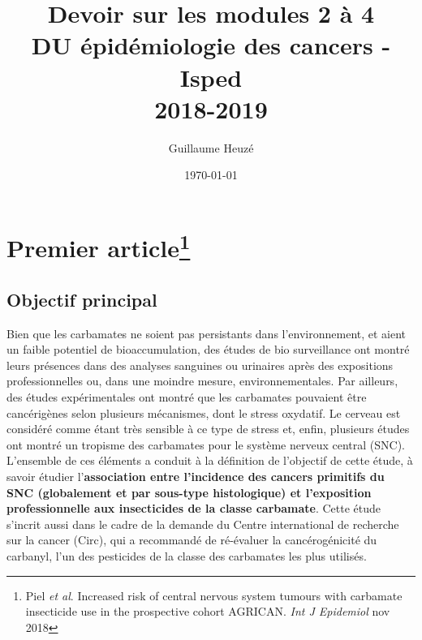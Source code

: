 \documentclass[10pt]{article}
\begin{document}
\title{Devoir sur les modules 2 à 4\\
\small{DU épidémiologie des cancers - Isped\\
2018-2019}}
\author{Guillaume Heuzé}
\date{\today}
\maketitle

\section{Premier article\protect\footnote{Piel \emph{et al}. Increased risk of central nervous system tumours with carbamate insecticide use in the prospective cohort AGRICAN. \emph{Int J Epidemiol} nov 2018}}

\subsection{Objectif principal}
Bien que les carbamates ne soient pas persistants dans l'environnement, et aient un faible potentiel de bioaccumulation, des études de bio surveillance ont montré leurs présences dans des analyses sanguines ou urinaires après des expositions professionnelles ou, dans une moindre mesure, environnementales. Par ailleurs, des études expérimentales ont montré que les carbamates pouvaient être cancérigènes selon plusieurs mécanismes, dont le stress oxydatif. Le cerveau est considéré comme étant très sensible à ce type de stress et, enfin, plusieurs études ont montré un tropisme des carbamates pour le système nerveux central (SNC). L'ensemble de ces éléments a conduit à la définition de l'objectif de cette étude, à savoir étudier l'\textbf{association entre l'incidence des cancers primitifs du SNC (globalement et par sous-type histologique) et l'exposition professionnelle aux insecticides de la classe carbamate}. Cette étude s'incrit aussi dans le cadre de la demande du Centre international de recherche sur la cancer (Circ), qui a recommandé de ré-évaluer la cancérogénicité du carbanyl, l'un des pesticides de la classe des carbamates les plus utilisés.
\end{document}
